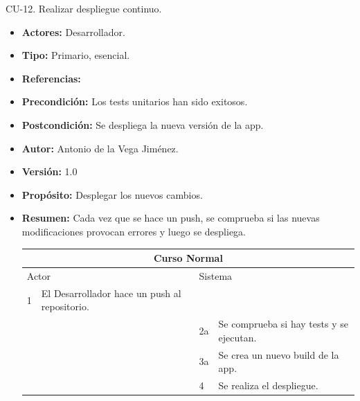 \item CU-12. Realizar despliegue continuo.
\begin{itemize}
  \item \textbf{Actores:} Desarrollador.
  \item \textbf{Tipo:} Primario, esencial.
  \item \textbf{Referencias:}
  \item \textbf{Precondición:} Los tests unitarios han sido exitosos.
  \item \textbf{Postcondición:} Se despliega la nueva versión de la app.
  \item \textbf{Autor:} Antonio de la Vega Jiménez.
  \item \textbf{Versión:} 1.0
  \item \textbf{Propósito:} Desplegar los nuevos cambios.
  \item \textbf{Resumen:} Cada vez que se hace un push, se comprueba si las nuevas modificaciones provocan errores y luego se despliega.
  \begin{table}[H]
    \centering
    \begin{tabularx}{\textwidth}{|l|X|l|X|}
      \hline
      \multicolumn{4}{|c|}{\cellcolor[HTML]{C0C0C0}Curso Normal}                                                 \\ \hline
      \multicolumn{2}{|l|}{\cellcolor[HTML]{EFEFEF}Actor} & \multicolumn{2}{l|}{\cellcolor[HTML]{EFEFEF}Sistema} \\ \hline
      1                         & El Desarrollador hace un push al repositorio.                        &                            &                         \\ \hline
                                &                         & 2a                          & Se comprueba si hay tests  y se ejecutan.                       \\ \hline
                                &                         & 3a                           & Se crea un nuevo build de la app.                       \\ \hline
                                &                         & 4                           & Se realiza el despliegue.                       \\ \hline


\end{tabularx}
\end{table}
\end{itemize}

